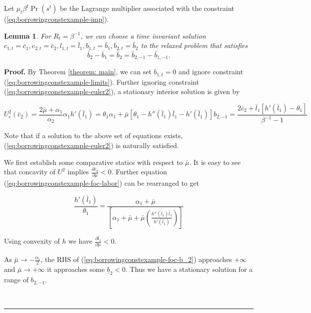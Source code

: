 \documentclass[thmsb,11pt]{article}
\newtheorem{lemma}{Lemma}
\newenvironment{proof}[1][Proof]{\noindent \textbf{#1.} }{\  \rule{0.5em}{0.5em}}
\begin{document}
\noindent Let $\mu_t\beta^t \Pr(s^t)$ be the Lagrange multiplier associated with the constraint (\ref{eq:borrowingconstexample-imp}).
 \begin{lemma}
 For $R_t=\beta^{-1}$, we can choose a  time invariant solution  $c_{1,t}= \bar{c}_{1},c_{2,t}=\bar{c}_{2},l_{1,t}=\bar{l}%
_{1},b_{1,t}=\bar{b}_{1},b_{2,t}=\bar{b}_{2}$ to the relaxed problem that satisfies
\begin{equation*}
\bar{b}_{2}-\bar{b}_{1}=\bar{b}_{2}=\bar{b}_{2,-1}-\bar{b}_{1,-1}.
\end{equation*}

\end{lemma}
\begin{proof}
  By Theorem \ref {theorem: main}, we can set $b_{1,t}=0$  and ignore constraint (\ref{eq:borrowingconstexample-limits}). Further ignoring constraint (\ref{eq:borrowingconstexample-euler2}), a stationary interior solution is given by

 \begin{subequations}
 \begin{equation}
  \label{eq:borrowingconstexample-foc-c2}
U^2_c(\bar{c}_2)=\frac{2\bar{\mu}+\alpha_1}{\alpha_2}
 \end{equation}
\begin{equation}
\label{eq:borrowingconstexample-foc-labor}
\alpha_1 h'(\bar{l}_1)=\theta_1\alpha_1+\bar{\mu}[\theta_1-h''(\bar{l}_1)\bar{l}_1-h'(\bar{l}_1)]
 \end{equation}
\begin{equation}
\label{eq:borrowingconstexample-foc-b_2}
b_{2,-1}=\frac{2\bar{c}_2+ \bar{l}_1\left[h'(\bar{l}_1)-\theta_1 \right] }{\beta^{-1}-1}
\end{equation}

 \end{subequations}


Note that if a solution to the above set of equations exists, (\ref{eq:borrowingconstexample-euler2}) is naturally satisfied.

We first establish some comparative statics with respect to $\bar{\mu}$. It is easy to see that concavity of $U^2$ implies $\frac{\partial \bar{c}_2}{\partial \mu}<0$. Further equation (\ref{eq:borrowingconstexample-foc-labor}) can be rearranged to get

 \[\frac{h'(\bar{l}_1)}{\theta_1}=\frac{\alpha_1+\bar{\mu}}{\left[\alpha_1+\bar{\mu}+\bar{\mu}\left(\frac{h''(\bar{l}_1)\bar{l}_1}{h'(\bar{l}_1)}\right)\right]}\]

 Using convexity of $h$ we have $\frac{\partial \bar{l}_1}{\partial \mu}<0$.

 As $\bar{\mu}\to -\frac{\alpha_1}{2}$, the RHS of (\ref{eq:borrowingconstexample-foc-b_2}) approaches $+\infty$ and $\bar{\mu}\to + \infty$ it approaches some $\underline{b}_2<0$. Thus we have a stationary solution for a range of $b_{2,-1}$.

\end{proof}
\end{document}
